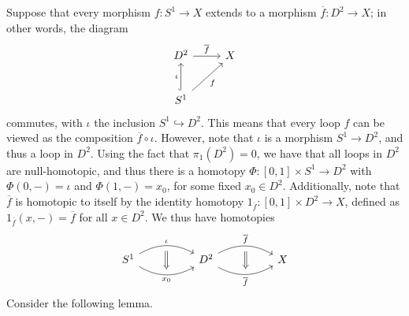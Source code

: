 \documentclass[11pt, letterpaper]{article}
\begin{document}
Suppose that every morphism $f : S^1 \to X$ extends to a morphism $ \overline{f} : D^2 \to X$; in other words, the diagram
\[\begin{tikzcd}[row sep = 2.5em, column sep = 2.5em]
D^2\ar[" \overline{f}  ", r]  & X \\
S^1 \ar[" \iota  ", hook, u] \ar[" f "', ur]  & 
\end{tikzcd}\]
commutes, with $\iota $ the inclusion $S^1 \hookrightarrow D^2$. This means that every loop $f$ can be viewed as the composition $\overline{f} \circ \iota $. However, note that $\iota $ is a morphism $S^1\to D^2$, and thus a loop in $D^2$. Using the fact that $\pi _1(D^2)=0$, we have that all loops in $D^2$ are null-homotopic, and thus there is a homotopy $\Phi : \left[ 0,1 \right] \times S^1 \to D^2$ with $\Phi (0,-)=\iota $ and $\Phi (1,-)=x_0$, for some fixed $x_0\in D^2$. Additionally, note that $\overline{f} $ is homotopic to itself by the identity homotopy $1_{\overline{f} } : [0,1]\times D^2 \to X$, defined as $1_{\overline{f} }(x,-)= \overline{f} $ for all $x\in D^2$. We thus have homotopies
\[\begin{tikzcd}[row sep = 5em, column sep = 5em]
	S^1 \ar[bend left, " \iota  "{name=i}, r] \ar[bend right, " x_0 "'{name=x0}, r]  & D^2 \ar[bend left, " \overline{f}  "{name=f1}, r] \ar[bend right, " \overline{f}  "'{name=f2}, r]  & X
	\arrow[Rightarrow, from=i, to=x0, shorten=5px]\arrow[Rightarrow, from=f1, to=f2, shorten=5px]
\end{tikzcd}\]
Consider the following lemma.
\end{document}
